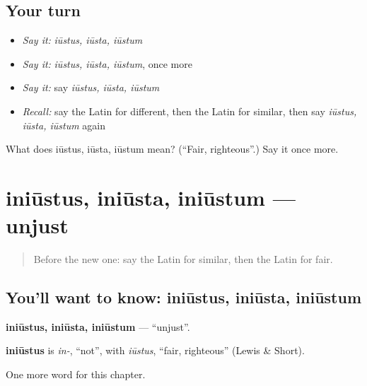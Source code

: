 \subsection*{Your turn}
\begin{itemize}
\raggedright
  \item \emph{Say it:} \emph{iūstus, iūsta, iūstum}
  \item \emph{Say it:} \emph{iūstus, iūsta, iūstum}, once more
  \item \emph{Say it:} say \emph{iūstus, iūsta, iūstum}
  \item \emph{Recall:} say the Latin for different, then the Latin for similar, then say \emph{iūstus, iūsta, iūstum} again
\end{itemize}

\begin{tcolorbox}[breakable,colback=teal!4,colframe=teal!35!black,title={Before you move on}]
What does iūstus, iūsta, iūstum mean? (\textquotedblleft{}Fair, righteous\textquotedblright{}.) Say it once more.
\end{tcolorbox}
\section[iniūstus, iniūsta, iniūstum]{iniūstus, iniūsta, iniūstum — unjust}

\label{lesson:LA-C266-iniustus}



\begin{quote}
Before the new one: say the Latin for similar, then the Latin for fair.
\end{quote}

\subsection*{You'll want to know: iniūstus, iniūsta, iniūstum}
\textbf{iniūstus, iniūsta, iniūstum} — \textquotedblleft{}unjust\textquotedblright{}.

\begin{cousinweb}
\textbf{iniūstus} is \emph{in-}, \textquotedblleft{}not\textquotedblright{}, with \emph{iūstus}, \textquotedblleft{}fair, righteous\textquotedblright{} (Lewis \& Short).
\end{cousinweb}

\begin{grammarlens}[title={What you've built}]
One more word for this chapter.
\end{grammarlens}

